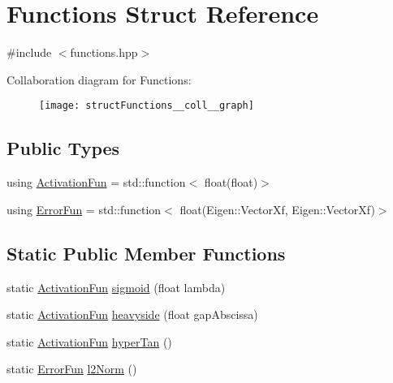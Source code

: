 \hypertarget{structFunctions}{}\section{Functions Struct Reference}
\label{structFunctions}


{\ttfamily \#include $<$functions.\+hpp$>$}



Collaboration diagram for Functions\+:\nopagebreak
\begin{figure}[H]
\begin{center}
\leavevmode
\texttt{[image: structFunctions\_\_coll\_\_graph]}
\end{center}
\end{figure}
\subsection*{Public Types}
\begin{DoxyCompactItemize}
\item 
using \hyperlink{structFunctions_ad25362ffa52b2f7933431190546593ac}{Activation\+Fun} = std\+::function$<$ float(float)$>$
\item 
using \hyperlink{structFunctions_a834bc4170f1caa8c77272ecf51dbae5c}{Error\+Fun} = std\+::function$<$ float(Eigen\+::\+Vector\+Xf, Eigen\+::\+Vector\+Xf)$>$
\end{DoxyCompactItemize}
\subsection*{Static Public Member Functions}
\begin{DoxyCompactItemize}
\item 
static \hyperlink{structFunctions_ad25362ffa52b2f7933431190546593ac}{Activation\+Fun} \hyperlink{structFunctions_a773de9cd59f7ccc3e2fe9822f0536ae4}{sigmoid} (float lambda)
\item 
static \hyperlink{structFunctions_ad25362ffa52b2f7933431190546593ac}{Activation\+Fun} \hyperlink{structFunctions_a683c495693f3e2a5ec55e30edaccfd2d}{heavyside} (float gap\+Abscissa)
\item 
static \hyperlink{structFunctions_ad25362ffa52b2f7933431190546593ac}{Activation\+Fun} \hyperlink{structFunctions_a0aac84382fccbc38cacccd566434d4a8}{hyper\+Tan} ()
\item 
static \hyperlink{structFunctions_a834bc4170f1caa8c77272ecf51dbae5c}{Error\+Fun} \hyperlink{structFunctions_a00bac40f42bb6c47d25c0cd238c4275a}{l2\+Norm} ()
\end{DoxyCompactItemize}


